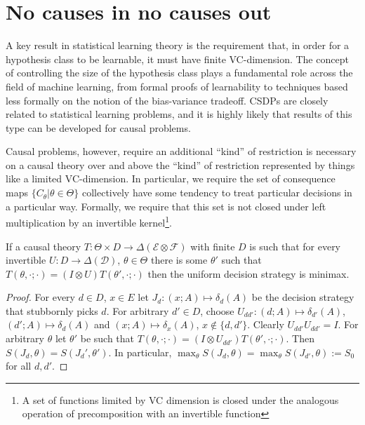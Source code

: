 \section{No causes in no causes out}

A key result in statistical learning theory is the requirement that, in order for a hypothesis class to be learnable, it must have finite VC-dimension. The concept of controlling the size of the hypothesis class plays a fundamental role across the field of machine learning, from formal proofs of learnability to techniques based less formally on the notion of the bias-variance tradeoff. CSDPs are closely related to statistical learning problems, and it is highly likely that results of this type can be developed for causal problems.

Causal problems, however, require an additional ``kind'' of restriction is necessary on a causal theory over and above the ``kind'' of restriction represented by things like a limited VC-dimension. In particular, we require the set of consequence maps $\{C_\theta |\theta\in \Theta\}$ collectively have some tendency to treat particular decisions in a particular way. Formally, we require that this set is not closed under left multiplication by an invertible kernel\footnote{A set of functions limited by VC dimension is closed under the analogous operation of precomposition with an invertible function}.

\begin{theorem}
If a causal theory $T:\Theta\times D\to \Delta(\mathcal{E}\otimes\mathcal{F})$ with finite $D$ is such that for every invertible $U:D\to \Delta(\mathcal{D})$, $\theta\in \Theta$ there is some $\theta'$ such that $T(\theta,\cdot;\cdot) = (I\otimes U)T(\theta',\cdot;\cdot)$ then the uniform decision strategy is minimax.
\end{theorem}

\begin{proof}
For every $d\in D$, $x\in E$ let $J_d:(x;A)\mapsto \delta_d(A)$ be the decision strategy that stubbornly picks $d$. For arbitrary $d'\in D$, choose $U_{dd'}:(d;A)\mapsto \delta_{d'}(A)$, $(d';A)\mapsto \delta_d(A)$ and $(x;A)\mapsto \delta_x(A)$, $x\not\in \{d,d'\}$. Clearly $U_{dd'}U_{dd'}=I$. For arbitrary $\theta$ let $\theta'$ be such that $T(\theta,\cdot;\cdot) = (I\otimes U_{dd'})T(\theta',\cdot;\cdot)$. Then $S(J_d,\theta) = S(J_d',\theta')$. In particular, $\max_\theta S(J_d,\theta) = \max_\theta S(J_{d'},\theta):=S_0$ for all $d,d'$.


\end{proof}

